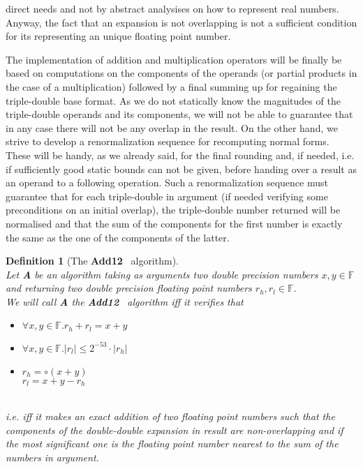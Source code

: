 \documentclass[a4paper,10pt,twoside]{article}
\newtheorem{definition}[theorem]{Definition}
\newcommand{\F}{\ensuremath{\mathbb {F}}}
\newcommand{\hi}{\ensuremath{\mathit{h}}}
\newcommand{\lo}{\ensuremath{\mathit{l}}}
\newcommand{\Add}{{\bf Add12}}
\begin{document}
direct needs and not by abstract analysises on how to represent real
numbers. Anyway, the fact that an expansion is not overlapping is not a
sufficient condition for its representing an unique floating point number.\par
The implementation of addition and multiplication operators will be finally be
based on computations on the components of the operands (or partial products
in the case of a multiplication) followed by a final summing up for
regaining the triple-double base format. As we do not statically know the
magnitudes of the triple-double operands and its components, we will not be
able to guarantee that in any case there will not be any overlap in the
result. On the other hand, we strive to develop a renormalization sequence for
recomputing normal forms. These will be handy, as we already said, for the
final rounding and, if needed, i.e. if sufficiently good static bounds can not
be given, before handing over a result as an operand to a following operation.
Such a renormalization sequence must guarantee that for each triple-double in
argument (if needed verifying some preconditions on an initial overlap), the
triple-double number returned will be normalised and that the sum of the
components for the first number is exactly the same as the one of the
components of the latter.\par
\begin{definition}[The \Add~ algorithm] \label{adddef} ~ \\
Let {\bf A} be an algorithm taking as arguments two double precision numbers $x,y \in \F$ and
returning two double precision floating point numbers $r_\hi, r_\lo \in \F$.\\
We will call {\bf A} the \Add~ algorithm iff it verifies that\\
\begin{itemize}
\item $\forall x,y \in \F. r_\hi + r_\lo = x + y$
\item $\forall x,y \in \F. \left \vert r_\lo \right \vert \leq 2^{-53} \cdot \left \vert r_\hi \right \vert$
\item $r_\hi = \circ\left( x + y \right)$ \\
$r_\lo = x + y - r_\hi$
\end{itemize} ~\\
i.e. iff it makes an exact addition of two floating point numbers such that
the components of the double-double expansion in result are non-overlapping
and if the most significant one is the floating point number nearest to the
sum of the numbers in argument.
\end{definition}
\end{document}
